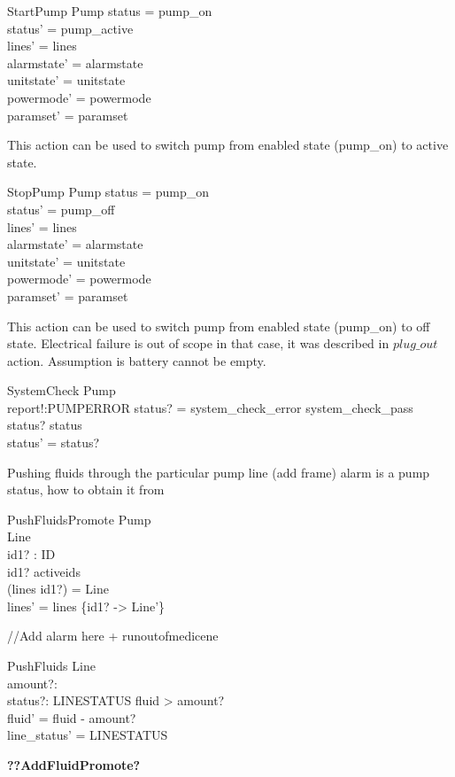 \documentclass{article}
\begin{document}
	\begin{schema}{StartPump}
		\Delta Pump
	\where
		status = pump\_on \\ 
		status' = pump\_active \\
		lines' = lines  \\
    	alarmstate' = alarmstate \\
    	unitstate' = unitstate \\
    	powermode' = powermode \\
		paramset' = paramset
	\end{schema}
	
	This action can be used to switch pump from enabled state (pump\_on) to active state.
	
	\begin{schema}{StopPump}
		\Delta Pump
	\where
		status = pump\_on \\ 
		status' = pump\_off \\
		lines' = lines  \\
    	alarmstate' = alarmstate \\
    	unitstate' = unitstate \\
    	powermode' = powermode \\
		paramset' = paramset
	\end{schema}	
			
	This action can be used to switch pump from enabled state (pump\_on) to off state. Electrical failure is out of scope in that case, it was described 
	in $plug\_out$ action. Assumption is battery cannot be empty.		
			
	\begin{schema}{SystemCheck}
		\Delta Pump\\
		report!:PUMPERROR
	\where 
		status? = system\_check\_error \lor system\_check\_pass \\
		status? \neq status\\
		status' = status?
	\end{schema}
	
	
	Pushing fluids through the particular pump line (add frame) alarm is a pump status, how to obtain it from
	
	\begin{schema}{PushFluidsPromote}
		\Delta Pump	\\
		\Delta Line \\
		id1? : ID \\
	\where 
		id1? \in activeids \\
		(lines id1?) = \theta Line \\
		lines' = lines \oplus \{id1? -> \theta Line'\} \\		
	\end{schema}
	
	//Add alarm here + runoutofmedicene
	\begin{schema}{PushFluids}
		\Delta Line \\
		amount?: \nat \\
		status?: LINESTATUS
	\where 
		fluid > amount? \\
		fluid' = fluid - amount? \\
		line_status' = LINESTATUS
	\end{schema}
	
	\textbf{??AddFluidPromote?}
\end{document}
